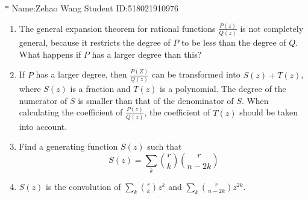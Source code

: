 \documentclass[12pt,a4paper]{article}
\makeatletter
\newtheorem*{solution}{Solution}
\theoremstyle{definition}
\renewenvironment{solution}[1][Solution] {\par\pushQED{\qed}\normalfont\topsep6\p@\@plus6\p@\relax\trivlist\item[\hskip\labelsep\bfseries#1\@addpunct{.}]\ignorespaces}{\popQED\endtrivlist\@endpefalse} \makeatother
\makeatother
\begin{document}
\noindent

\noindent{}
\begin{center}
\footnotesize{\color{blue}$*$ Name:Zehao Wang  \quad Student ID:518021910976}
\end{center}

\begin{enumerate}
    \item 
        The general expansion theorem for rational functions $\frac{P(z)}{Q(z)}$ is not completely general, because it restricts the degree of $P$ to be less than the degree of $Q$. What happens if $P$ has a larger degree than this?
        \begin{solution}
        	If $P$ has a larger degree, then $\frac{P(Z)}{Q(z)}$ can be transformed into $S(z)+T(z)$, where $S(z)$ is a fraction and $T(z)$ is a polynomial. The degree of the numerator of $S$ is smaller than that of the denominator of $S$. When calculating the coefficient of $\frac{P(z)}{Q(z)}$, the coefficient of $T(z)$ should be taken into account.
        \end{solution}
    \item 
        Find a generating function $S(z)$ such that
        \begin{equation*}
            [z^n]S(z)=\sum_{k}\binom{r}{k}\binom{r}{n-2k}
        \end{equation*}
        \begin{solution}
        	$S(z)$ is the convolution of $\sum_k\binom{r}{k}z^k$ and $\sum_k\binom{r}{n-2k}z^{2k}$.
        	

\end{solution}
\end{enumerate}
\end{document}
